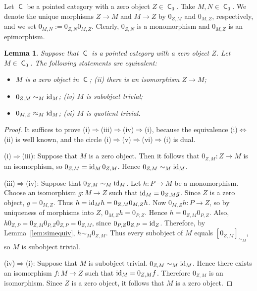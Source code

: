 \documentclass[12pt]{amsart}
\newtheorem{lem}[thm]{Lemma}
\theoremstyle{definition}
\newcommand{\id}{{\rm id}}
\DeclareMathOperator{\C}{\mathsf C}
\begin{document}
Let $\C$ be a pointed category with a
zero object $Z \in \C_0$.
Take \(M,N \in \C_0\). 
We denote the unique morphisms 
\(Z \to M\) and \(M \to Z \) by \(0_{Z,M}\) 
and \(0_{M,Z}\), respectively, and
we set $0_{M,N} := 0_{Z,N} 0_{M,Z}$.
Clearly, $0_{Z,N}$ is a monomorphism and 
$0_{M,Z}$ is an epimorphism.

\begin{lem}\label{lem:pointed}
Suppose that $\C$ is a pointed category 
with a zero object $Z$. Let $M \in \C_0$.
The following statements are equivalent:
\begin{itemize}[widest=(iii)]

\item[{\rm (i)}] $M$ is a zero object in $\C$; 
\quad
{\rm (ii)} there is an isomorphism $Z \to M$; 

\item[{\rm (iii)}] $0_{Z,M} \sim_M \id_M$;
\quad
{\rm (iv)} $M$ is subobject trivial;

\item[{\rm (v)}] $0_{M,Z} \approx_M \id_M$;
\quad
{\rm (vi)} $M$ is quotient trivial.

\end{itemize}
\end{lem}

\begin{proof}
It suffices to prove (i)$\Rightarrow$(iii)$\Rightarrow$(iv)$\Rightarrow$(i), because the equivalence (i)$\Leftrightarrow$(ii) is well known, and the circle (i)$\Rightarrow$(v)$\Rightarrow$(vi)$\Rightarrow$(i) is dual.

(i)$\Rightarrow$(iii):
Suppose that $M$ is a zero object. Then it follows that
$0_{Z,M}:Z\to M$ is an isomorphism, so 
$0_{Z,M}=\id_M\,0_{Z,M}$. Hence $0_{Z,M}\sim_M \id_M$.

(iii)$\Rightarrow$(iv):
Suppose that $0_{Z,M}\sim_M \id_M$.
Let $h:P\to M$ be a monomorphism.
Choose an isomorphism $g:M\to Z$ such that
$\id_M=0_{Z,M}g$.
Since $Z$ is a zero object, $g=0_{M,Z}$. Thus
$h=\id_M h=0_{Z,M}0_{M,Z}h$.
Now $0_{M,Z}h:P\to Z$, so by uniqueness of morphisms into $Z$,
$0_{M,Z}h=0_{P,Z}$. Hence
$h=0_{Z,M}0_{P,Z}$. Also,
$h0_{Z,P}=0_{Z,M}0_{P,Z}0_{Z,P}=0_{Z,M}$,
since $0_{P,Z}0_{Z,P}=\id_Z$.
Therefore, by Lemma~\ref{lem:simequiv}, \(h\sim_M 0_{Z,M}\).
Thus every subobject of \(M\) equals \([0_{Z,M}]_{\sim_M}\), so \(M\) is subobject trivial.

(iv)$\Rightarrow$(i):
Suppose that $M$ is subobject trivial.
$0_{Z,M}\sim_M \id_M$.
Hence there exists an isomorphism \(f:M\to Z\) such that
$\id_M=0_{Z,M}f$.
Therefore \(0_{Z,M}\) is an isomorphism. Since \(Z\) is a zero object, it follows that \(M\) is a zero object.
\end{proof}
\end{document}
